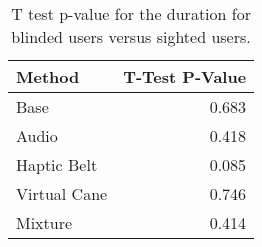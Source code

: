 
\begin{table}[!htb]
\centering
\caption{T test p-value for the duration for blinded users versus sighted users.}
\label{tab:ttest_duration}
\begin{tabular}{lr}
\toprule
      Method &  T-Test P-Value \\
\midrule
        Base &           0.683 \\
       Audio &           0.418 \\
 Haptic Belt &           0.085 \\
Virtual Cane &           0.746 \\
     Mixture &           0.414 \\
\bottomrule
\end{tabular}
\end{table}

